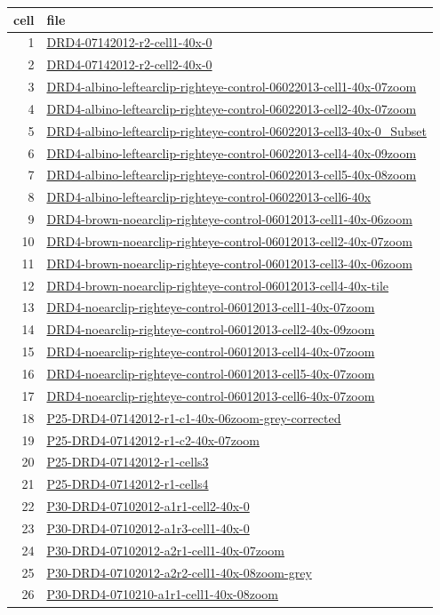 \documentclass{article}
\begin{document}
\begin{table}
  \centering
  \begin{tabular}{rl}
    \toprule
    cell & file \\
    \midrule
1& \url{DRD4-07142012-r2-cell1-40x-0} \\
2& \url{DRD4-07142012-r2-cell2-40x-0} \\
3&
\url{DRD4-albino-leftearclip-righteye-control-06022013-cell1-40x-07zoom} \\
4&
\url{DRD4-albino-leftearclip-righteye-control-06022013-cell2-40x-07zoom} \\
5&
\url{DRD4-albino-leftearclip-righteye-control-06022013-cell3-40x-0_Subset} \\
6&
\url{DRD4-albino-leftearclip-righteye-control-06022013-cell4-40x-09zoom} \\
7&
\url{DRD4-albino-leftearclip-righteye-control-06022013-cell5-40x-08zoom} \\
8& \url{DRD4-albino-leftearclip-righteye-control-06022013-cell6-40x} \\
9&
\url{DRD4-brown-noearclip-righteye-control-06012013-cell1-40x-06zoom} \\
10&
\url{DRD4-brown-noearclip-righteye-control-06012013-cell2-40x-07zoom} \\
11&
\url{DRD4-brown-noearclip-righteye-control-06012013-cell3-40x-06zoom} \\
12&
\url{DRD4-brown-noearclip-righteye-control-06012013-cell4-40x-tile} \\
13& \url{DRD4-noearclip-righteye-control-06012013-cell1-40x-07zoom} \\
14& \url{DRD4-noearclip-righteye-control-06012013-cell2-40x-09zoom} \\
15& \url{DRD4-noearclip-righteye-control-06012013-cell4-40x-07zoom} \\
16& \url{DRD4-noearclip-righteye-control-06012013-cell5-40x-07zoom} \\
17& \url{DRD4-noearclip-righteye-control-06012013-cell6-40x-07zoom} \\
18& \url{P25-DRD4-07142012-r1-c1-40x-06zoom-grey-corrected} \\
19& \url{P25-DRD4-07142012-r1-c2-40x-07zoom} \\
20& \url{P25-DRD4-07142012-r1-cells3} \\
21& \url{P25-DRD4-07142012-r1-cells4} \\
22& \url{P30-DRD4-07102012-a1r1-cell2-40x-0} \\
23& \url{P30-DRD4-07102012-a1r3-cell1-40x-0} \\
24& \url{P30-DRD4-07102012-a2r1-cell1-40x-07zoom} \\
25& \url{P30-DRD4-07102012-a2r2-cell1-40x-08zoom-grey} \\
26& \url{P30-DRD4-0710210-a1r1-cell1-40x-08zoom} \\
\bottomrule
  \end{tabular}
\end{table}
\end{document}
